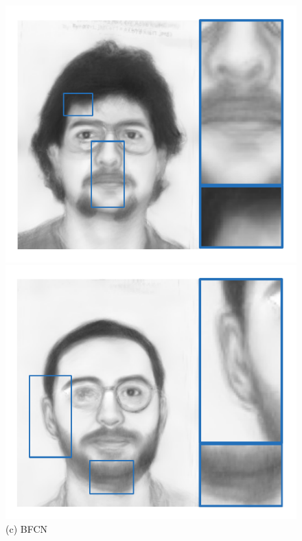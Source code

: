 \documentclass[10pt,twocolumn,letterpaper]{article}
\begin{document}
\begin{figure}[htbp]
\begin{minipage}[t]{0.138\linewidth}
\includegraphics[width=0.99\linewidth]{img/example3_Filter.pdf}
\includegraphics[width=0.99\linewidth]{img/example4_Filter.pdf}
(c) BFCN
\end{minipage}
\begin{minipage}[t]{0.138\linewidth}
\centering

\end{minipage}
\end{figure}
\end{document}
